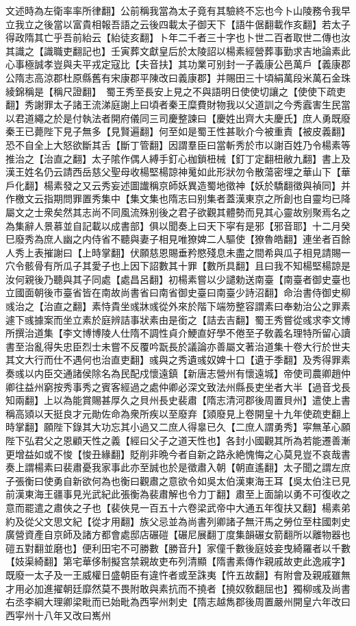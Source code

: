 文述時為左衛率率所律翻】公前稱我當為太子竟有其驗終不忘也今卜山陵務令我早立我立之後當以富貴相報吾語之云後四載太子御天下【語牛倨翻載作亥翻】若太子得政隋其亡乎吾前紿云【紿徒亥翻】卜年二千者三十字也卜世二百者取世二傳也汝其識之【識職吏翻記也】壬寅葬文獻皇后於太陵詔以楊素經營葬事勤求吉地論素此心事極誠孝豈與夫平戎定寇比【夫音扶】其功業可别封一子義康公邑萬戶【義康郡公隋志高涼郡杜原縣舊有宋康郡平陳改曰義康郡】并賜田三十頃絹萬段米萬石金珠綾錦稱是【稱尺證翻】　蜀王秀至長安上見之不與語明日使使切讓之【使使下疏吏翻】秀謝罪太子諸王流涕庭謝上曰頃者秦王糜費財物我以父道訓之今秀蠧害生民當以君道繩之於是付執法者開府儀同三司慶整諫曰【慶姓出齊大夫慶氏】庶人勇既廢秦王已薨陛下見子無多【見賢遍翻】何至如是蜀王性甚耿介今被重責【被皮義翻】恐不自全上大怒欲斷其舌【斷丁管翻】因謂羣臣曰當斬秀於市以謝百姓乃令楊素等推治之【治直之翻】太子隂作偶人縛手釘心枷鎖杻械【釘丁定翻杻敝九翻】書上及漢王姓名仍云請西岳慈父聖母收楊堅楊諒神䰟如此形狀勿令散蕩密埋之華山下【華戶化翻】楊素發之又云秀妄述圖䜟稱京師妖異造蜀地徵神【妖於驕翻徵與禎同】并作檄文云指期問罪置秀集中【集文集也隋志曰别集者蓋漢東京之所創也自靈均已降屬文之士衆矣然其志尚不同風流殊别後之君子欲觀其體勢而見其心靈故别聚焉名之為集辭人景慕並自記載以成書部】俱以聞奏上曰天下寜有是邪【邪音耶】十二月癸巳廢秀為庶人幽之内侍省不聽與妻子相見唯獠婢二人驅使【獠魯皓翻】連坐者百餘人秀上表摧謝曰【上時掌翻】伏願慈恩賜垂矜愍殘息未盡之間希與瓜子相見請賜一穴令骸骨有所瓜子其愛子也上因下詔數其十罪【數所具翻】且曰我不知楊堅楊諒是汝何親後乃聽與其子同處【處昌呂翻】初楊素嘗以少譴勅送南臺【南臺者御史臺也立國面朝後市臺省皆在南故尚書省曰南省御史臺曰南臺少詩沼翻】命治書侍御史柳彧治之【治直之翻】素恃貴坐彧牀彧從外來於階下端笏整容謂素曰奉勅治公之罪素遽下彧據案而坐立素於庭辨詰事狀素由是銜之【詰去吉翻】蜀王秀嘗從彧求李文博所撰治道集【李文博博陵人仕隋不調性貞介鯁直好學不倦至子敎義名理特所留心讀書至治亂得失忠臣烈士未嘗不反覆吟翫長於議論亦善屬文著治道集十卷大行於世夫其文大行而仕不遇何也治直吏翻】彧與之秀遺彧奴婢十口【遺于季翻】及秀得罪素奏彧以内臣交通諸侯除名為民配戍懷遠鎮【新唐志營州有懷遠城】帝使司農卿趙仲卿往益州窮按秀事秀之賓客經過之處仲卿必深文致法州縣長吏坐者大半【過音戈長知兩翻】上以為能賞賜甚厚久之貝州長史裴肅【隋志清河郡後周置貝州】遣使上書稱高熲以天挺良才元勛佐命為衆所疾以至廢弃【熲廢見上卷開皇十九年使疏吏翻上時掌翻】願陛下錄其大功忘其小過又二庶人得辠已久【二庶人謂勇秀】寜無革心願陛下弘君父之恩顧天性之義【經曰父子之道天性也】各封小國觀其所為若能遷善漸更增益如或不悛【悛丑緣翻】貶削非晩今者自新之路永絶愧悔之心莫見豈不哀哉書奏上謂楊素曰裴肅憂我家事此亦至誠也於是徵肅入朝【朝直遙翻】太子聞之謂左庶子張衡曰使勇自新欲何為也衡曰觀肅之意欲令如吳太伯漢東海王耳【吳太伯注已見前漢東海王疆事見光武紀此張衡為裴肅解也令力丁翻】肅至上面諭以勇不可復收之意而罷遣之肅俠之子也【裴俠見一百五十六卷梁武帝中大通五年復扶又翻】楊素弟約及從父文思文紀【從才用翻】族父忌並為尚書列卿諸子無汗馬之勞位至柱國刺史廣營資產自京師及諸方都會處邸店碾磑【碾尼展翻丁度集韻碾女箭翻所以離物器也磑五對翻並磨也】便利田宅不可勝數【勝音升】家僮千數後庭妓妾曳綺羅者以千數【妓渠綺翻】第宅華侈制擬宫禁親故吏布列清顯【隋書素傳作親戚故吏此逸戚字】既廢一太子及一王威權日盛朝臣有違忤者或至誅夷【忤五故翻】有附會及親戚雖無才用必加進擢朝廷靡然莫不畏附敢與素抗而不撓者【撓奴敎翻屈也】獨柳彧及尚書右丞李綱大理卿梁毗而已始毗為西寜州刺史【隋志越雋郡後周置嚴州開皇六年改曰西寜州十八年又改曰嶲州